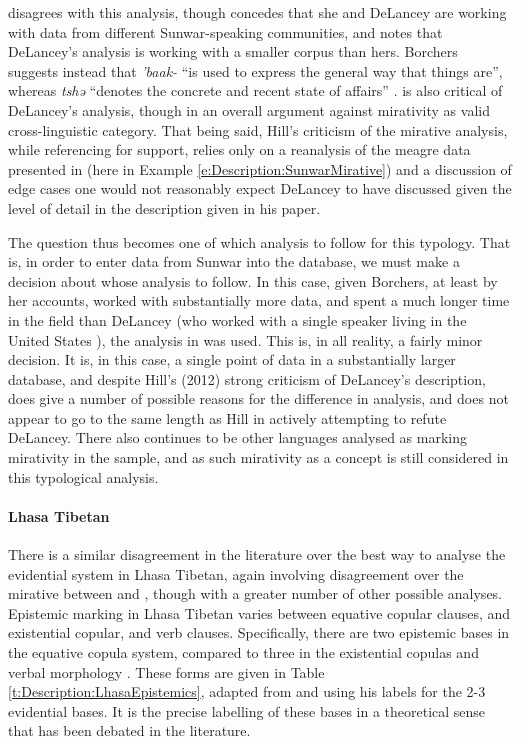  disagrees with this analysis, though concedes that she and DeLancey are working with data from different Sunwar-speaking communities, and notes that DeLancey's analysis is working with a smaller corpus than hers. Borchers suggests instead that \textit{'baak-} ``is used to express the general way that things are'', whereas \textit{tshə} ``denotes the concrete and recent state of affairs'' \cite[164]{Borchers2008}.  is also critical of DeLancey's analysis, though in an overall argument against mirativity as valid cross-linguistic category. That being said, Hill's criticism of the mirative analysis, while referencing  for support, relies only on a reanalysis of the meagre data presented in  (here in Example \ref{e:Description:SunwarMirative}) and a discussion of edge cases one would not reasonably expect DeLancey to have discussed given the level of detail in the description given in his paper.

The question thus becomes one of which analysis to follow for this typology. That is, in order to enter data from Sunwar into the database, we must make a decision about whose analysis to follow. In this case, given Borchers, at least by her accounts, worked with substantially more data, and spent a much longer time in the field than DeLancey (who worked with a single speaker living in the United States \cite{DeLanceyMirativity1997}), the analysis in  was used. This is, in all reality, a fairly minor decision. It is, in this case, a single point of data in a substantially larger database, and despite Hill's (2012) strong criticism of DeLancey's description,  does give a number of possible reasons for the difference in analysis, and does not appear to go to the same length as Hill in actively attempting to refute DeLancey. There also continues to be other languages analysed as marking mirativity in the sample, and as such mirativity as a concept is still considered in this typological analysis.

\paragraph{Lhasa Tibetan}
There is a similar disagreement in the literature over the best way to analyse the evidential system in Lhasa Tibetan, again involving disagreement over the mirative between  and , though with a greater number of other possible analyses. Epistemic marking in Lhasa Tibetan varies between equative copular clauses, and existential copular, and verb clauses. Specifically, there are two epistemic bases in the equative copula system, compared to three in the existential copulas and verbal morphology \cite{DeLancey2017Tibetan}. These forms are given in Table \ref{t:Description:LhasaEpistemics}, adapted from  and using his labels for the 2-3 evidential bases. It is the precise labelling of these bases in a theoretical sense that has been debated in the literature.

